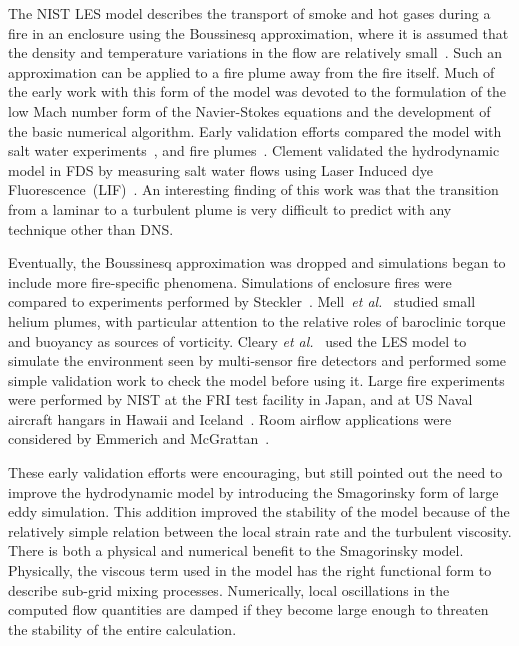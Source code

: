 The  NIST LES model  describes the  transport of  smoke and  hot gases during  a fire  in an  enclosure using  the  Boussinesq approximation, where
it is assumed that the density and temperature variations in the flow                           are                          relatively
small~\cite{Rehm:1,Rehm:SIAM83,Rehm:ANM85,Rehm:IAFSS3}.     Such    an approximation  can be  applied  to a  fire  plume away  from the  fire itself.
Much of  the early  work  with this  form of  the model  was devoted  to  the  formulation of  the  low  Mach  number form  of  the Navier-Stokes
equations and  the development  of the  basic numerical algorithm.   Early validation  efforts  compared the  model with  salt water
experiments~\cite{Baum:1,McGrattan:1,Rehm:IAFSS5},   and  fire plumes~\cite{Baum:IAFSS5,Baum:2,Baum:3,Baum:4}.  Clement validated the hydrodynamic
model  in FDS by  measuring salt water flows  using Laser Induced   dye   Fluorescence~(LIF)~\cite{Clement:1}.  An   interesting finding  of this
work was  that the  transition from  a laminar  to a turbulent plume is very difficult  to predict with any technique other than DNS.

Eventually, the  Boussinesq approximation was  dropped and simulations began  to   include  more  fire-specific   phenomena.  Simulations  of
enclosure   fires   were   compared   to  experiments   performed   by Steckler~\cite{McGrattan:4}.  Mell~{\em  et al.}~\cite{Mell:1} studied small
helium  plumes, with particular attention to  the relative roles of  baroclinic torque and  buoyancy as  sources of  vorticity.  Cleary {\em  et
al.}~\cite{LES:6}  used   the  LES  model  to  simulate  the environment  seen by  multi-sensor fire  detectors and  performed some simple validation
work to check the model before using it.  Large fire experiments were performed by NIST  at the FRI test facility in Japan, and at US Naval aircraft
hangars in Hawaii and Iceland~\cite{Davis:1}. Room   airflow   applications   were   considered  by   Emmerich   and
McGrattan~\cite{Emmerich:1,Emmerich:2}.

These early validation efforts were encouraging, but still pointed out the  need  to  improve  the  hydrodynamic  model  by  introducing  the
Smagorinsky form of large eddy simulation.  This addition improved the stability  of the  model  because of  the  relatively simple  relation between
the  local strain rate  and the turbulent viscosity.  There is both   a   physical  and   numerical   benefit   to  the   Smagorinsky model.
Physically,  the viscous term used  in the model  has the right functional  form to describe  sub-grid mixing  processes. Numerically, local
oscillations in the computed  flow quantities are damped if they become  large   enough  to  threaten  the  stability   of  the  entire calculation.

